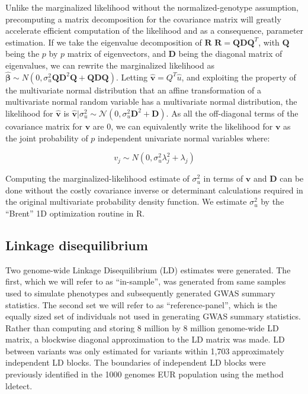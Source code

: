 Unlike the marginalized likelihood without the normalized-genotype assumption,
precomputing a matrix decomposition for the covariance matrix will greatly
accelerate efficient computation of the likelihood
and as a consequence, parameter estimation.
If we take the eigenvalue decomposition of $\textbf{R}$ $\textbf{R}=\textbf{Q}\textbf{D}\textbf{Q}^T$, with $\textbf{Q}$ 
being the $p$ by $p$ matrix of
eigenvectors, and $\textbf{D}$ being the diagonal matrix of eigenvalues, we can rewrite the marginalized likelihood as
$\hat{\boldsymbol{\beta}} \sim N(0,\sigma_u^2\textbf{QD}^2\textbf{Q}+\textbf{QDQ})$.  Letting
$\hat{\textbf{v}} = Q^{T}\hat{u}$, and exploiting the property of
the multivariate normal distribution that an affine transformation of a multivariate normal random variable has a multivariate normal distribution, the
likelihood for $\hat{\textbf{v}}$ is $\hat{\textbf{v}}|\sigma_u^2 \sim \mathcal{N}(0,\sigma_u^2\textbf{D}^{2}+\textbf{D})$.  As all the off-diagonal terms of
the covariance matrix for ${\textbf{v}}$ are $0$, we can equivalently write the likelihood for ${\textbf{v}}$ as the joint probability of $p$ independent
univariate normal variables where:

\[ v_j \sim N(0,\sigma^2_u\lambda_j^2+\lambda_j) \]

Computing the marginalized-likelihood estimate of $\sigma^2_u$ in terms of $\textbf{v}$ and $\textbf{D}$ can be done without the costly covariance inverse or determinant calculations required in the original multivariate probability density function.  We estimate $\sigma^2_u$ by the ``Brent'' 1D optimization routine in R\cite{brent1972algorithms}. 


\subsection{Linkage disequilibrium}\label{sec:org828aaeb}

Two genome-wide Linkage Disequilibrium (LD) estimates were generated.  The first, which we will refer to as ``in-sample'', was generated from same samples used to simulate phenotypes and subsequently generated GWAS summary statistics.  The second set we will refer to as ``reference-panel'', which is the equally sized set of individuals not used in generating GWAS summary statistics.  Rather than computing and storing 8 million by 8 million genome-wide LD matrix, a blockwise diagonal approximation to the LD matrix was made.  LD between variants was only estimated for variants within 1,703 approximately independent LD blocks.  The boundaries of independent LD blocks were previously identified in the 1000 genomes EUR population using the method ldetect\cite{ldetect}.  

